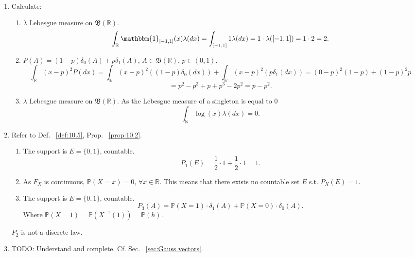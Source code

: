 \begin{exercise}[]
\begin{enumerate}[label=(\alph*)]
        \item Calculate:
            \begin{enumerate}[label=\arabic*.]
                \item $\lambda$ Lebesgue measure on $\mathfrak{B}(\mathbb{R})$.
                    \[
                    \int_{\mathbb{R}} \mathbbm{1}_{[-1,1]}(x) \lambda(dx)
                    = \int_{[-1,1]} 1 \lambda(dx) = 1 \cdot \lambda([-1,1]) = 1 \cdot 2 = 2
                    .\] 
                \item $P(A) = (1-p)\delta_0(A) + p \delta_1(A)$, $A \in \mathfrak{B}(\mathbb{R})$, $p \in (0,1)$.
                    \[
                    \int_{\mathbb{R}} (x-p)^{2}P(dx)
                    = \int_{\mathbb{R}} (x-p)^{2} ((1-p)\delta_0(dx)) + \int_{\mathbb{R}} (x-p)^{2}(p\delta_1(dx))
                    = (0-p)^{2}(1-p) + (1-p)^{2}p
                    \] 
                    \[
                    = p^{2} -p^{3} + p + p^{3} -2p^{2} = p-p^{2}
                    .\] 
                \item $\lambda$ Lebesgue measure on $\mathfrak{B}(\mathbb{R})$. As the Lebesgue measure of a singleton 
                    is equal to $0$
                    \[
                    \int_{\mathbb{N}} \log(x)\lambda(dx) = 0
                    .\] 
            \end{enumerate}
        \item
            Refer to Def. ~\ref{def:10.5}, Prop. ~\ref{prop:10.2}.
            \begin{enumerate}[label=\arabic*.]
                \item The support is $E=\{0,1\} $, countable.
                    \[
                    P_1(E) = \frac{1}{2} \cdot 1 + \frac{1}{2} \cdot 1 = 1
                    .\] 
                \item As $F_X$ is continuous, $\mathbb{P}(X=x)=0$, $\forall x \in \mathbb{R}$. This means that there exists
                    no countable set $E$ s.t. $P_X(E)=1$.
                \item The support is $E=\{0,1\} $, countable.
                    \[
                    P_3(A) = \mathbb{P}(X=1)\cdot \delta_1(A) + \mathbb{P}(X=0)\cdot \delta_0(A)
                    .\] 
                    Where $\mathbb{P}(X=1) = \mathbb{P}(X^{-1}(1)) = \mathbb{P}(h)$.
            \end{enumerate}
            $P_2$ is not a discrete law.
        \item  TODO: Understand and complete. Cf. Sec. ~\ref{sec:Gauss vectors}.

    \end{enumerate}
\end{exercise}

